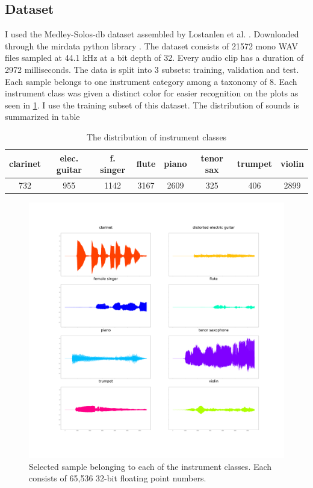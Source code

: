 \documentclass[11pt]{article}
\begin{document}
\subsection{Dataset}
\label{sec:orgac308b8}

I used the Medley-Solos-db dataset assembled by Lostanlen et al. \cite{medley}. Downloaded through the mirdata python library \cite{bittner_fuentes_2019}. The dataset consists of 21572 mono WAV files sampled at 44.1 kHz at a bit depth of 32. Every audio clip has a duration of 2972 milliseconds. The data is split into 3 subsets: training, validation and test. Each sample belongs to one instrument category among a taxonomy of 8. Each instrument class was given a distinct color for easier recognition on the plots as seen in \ref{fig:8-plots}. I use the training subset of this dataset. The distribution of sounds is summarized in table \

\begin{table}[h!]
\centering
\begin{tabular}{ |c|c|c|c|c|c|c|c| }
\hline
clarinet & elec. guitar & f. singer & flute & piano & tenor sax & trumpet & violin \\
\hline
732 & 955 & 1142 & 3167 & 2609 & 325 & 406 & 2899 \\
\hline
\end{tabular}
\caption{\label{table:distr_of_sounds}The distribution of instrument classes}
\end{table}

\begin{figure}[h!]
\centering
\includegraphics[width=.9\linewidth]{./Figures/8_samples.png}
\caption{Selected sample belonging to each of the instrument classes. Each consists of 65,536 32-bit floating point numbers.}
\label{fig:8-plots}
\end{figure}
\end{document}
